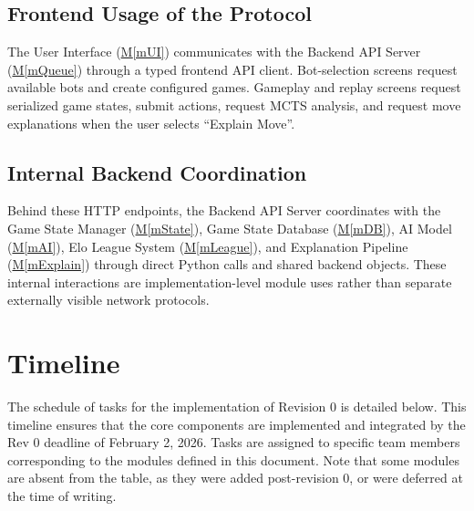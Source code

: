 \documentclass[12pt, titlepage]{article}
\newcommand{\mref}[1]{\hyperref[sec:#1]{M\ref*{#1}}}
\begin{document}
\subsection*{Frontend Usage of the Protocol}

The User Interface (\mref{mUI}) communicates with the Backend API Server (\mref{mQueue}) through a typed
frontend API client.
Bot-selection screens request available bots and create configured games.
Gameplay and replay screens request serialized game states, submit actions, request MCTS analysis,
and request move explanations when the user selects ``Explain Move''.

\subsection*{Internal Backend Coordination}

Behind these HTTP endpoints, the Backend API Server coordinates with the Game State Manager (\mref{mState}),
Game State Database (\mref{mDB}), AI Model (\mref{mAI}), Elo League System (\mref{mLeague}),
and Explanation Pipeline (\mref{mExplain}) through direct Python calls and shared backend objects.
These internal interactions are implementation-level module uses rather than separate externally visible network protocols.


\section{Timeline}

The schedule of tasks for the implementation of Revision 0 is detailed below.
This timeline ensures that the core components are implemented and integrated by the Rev 0 deadline of February 2, 2026.
Tasks are assigned to specific team members corresponding to the modules defined in this document.
Note that some modules are absent from the table, as they were added post-revision 0, or were deferred at the time of writing.
\end{document}
